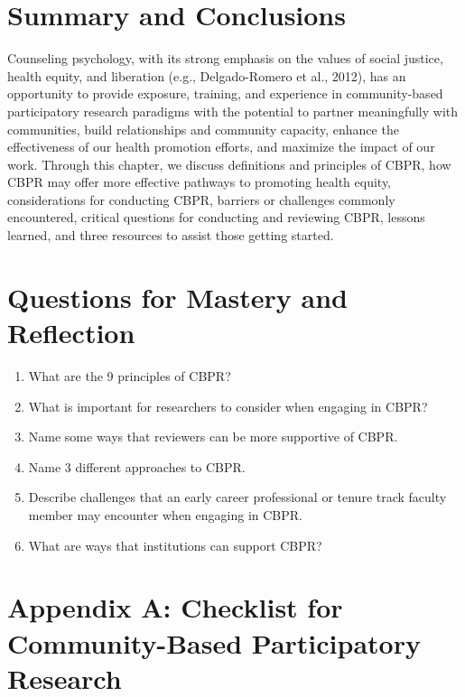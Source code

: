 \documentclass[
  11pt,
]{book}
\providecommand{\tightlist}{%
  \setlength{\itemsep}{0pt}\setlength{\parskip}{0pt}}
\begin{document}
\section{Summary and Conclusions}\label{summary-and-conclusions}

Counseling psychology, with its strong emphasis on the values of social justice, health equity, and liberation (e.g., Delgado-Romero et al., 2012), has an opportunity to provide exposure, training, and experience in community-based participatory research paradigms with the potential to partner meaningfully with communities, build relationships and community capacity, enhance the effectiveness of our health promotion efforts, and maximize the impact of our work. Through this chapter, we discuss definitions and principles of CBPR, how CBPR may offer more effective pathways to promoting health equity, considerations for conducting CBPR, barriers or challenges commonly encountered, critical questions for conducting and reviewing CBPR, lessons learned, and three resources to assist those getting started.

\section{Questions for Mastery and Reflection}\label{questions-for-mastery-and-reflection}

\begin{enumerate}
\def\labelenumi{\arabic{enumi}.}
\tightlist
\item
  What are the 9 principles of CBPR?
\item
  What is important for researchers to consider when engaging in CBPR?
\item
  Name some ways that reviewers can be more supportive of CBPR.
\item
  Name 3 different approaches to CBPR.
\item
  Describe challenges that an early career professional or tenure track faculty member may encounter when engaging in CBPR.
\item
  What are ways that institutions can support CBPR?
\end{enumerate}

\section{Appendix A: Checklist for Community-Based Participatory Research}\label{appendix-a-checklist-for-community-based-participatory-research}
\end{document}
